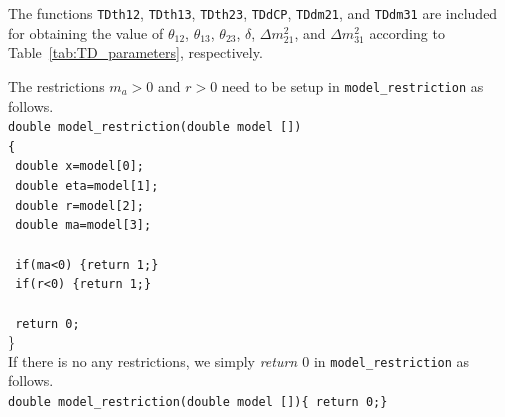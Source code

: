\documentclass[aps,prd,nofootinbib,preprint]{revtex4}
\begin{document}
The functions \texttt{TDth12}, \texttt{TDth13}, \texttt{TDth23}, \texttt{TDdCP}, \texttt{TDdm21}, and \texttt{TDdm31} are included for obtaining the value of $\theta_{12}$, $\theta_{13}$, $\theta_{23}$, $\delta$, $\Delta m_{21}^2$, and $\Delta m_{31}^2$ according to Table~\ref{tab:TD_parameters}, respectively. 

The restrictions $m_a>0$ and $r>0$ need to be setup in \texttt{model\_restriction} as follows.\vspace{0.2cm}\\
\texttt{double model\_restriction(double model [])}\\
\texttt{\{}\\
\texttt{    double x=model[0];}\\
\texttt{    double eta=model[1];}\\
\texttt{    double r=model[2];}\\
\texttt{    double ma=model[3];}\\
    \\
\texttt{    if(ma<0) \{return 1;\}}\\
\texttt{    if(r<0) \{return 1;\}}\\
\\ 
\texttt{    return 0;}\\
\}\vspace{0.2cm}\\
If there is no any restrictions, we simply \textit{return $0$} in \texttt{model\_restriction} as follows.\vspace{0.2cm}\\
\texttt{double model\_restriction(double model [])\{ return 0;\} }\vspace{0.2cm}\\
\end{document}
